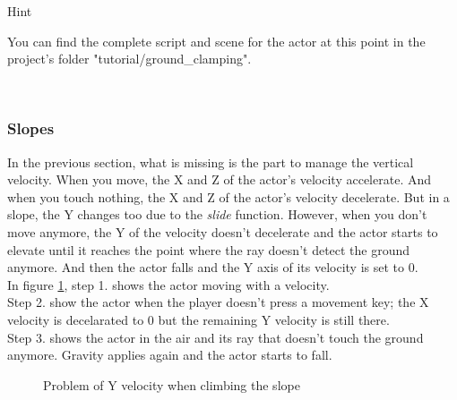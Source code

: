 \documentclass[10pt,a4paper]{article}
\newenvironment{hint}{%
\begin{bclogo}[logo=\bcinfo, couleurBarre=Green, noborder=true, 
               couleur=white]{Hint}
}{%
\end{bclogo}\hspace{1px}\\
}
\begin{document}
\begin{hint}
You can find the complete script and scene for the actor at this point in the project's folder "tutorial/ground\_clamping".
\end{hint}

\subsubsection{Slopes}
\label{subsec:slopes}
In the previous section, what is missing is the part to manage the vertical velocity. When you move, the X and Z of the actor's velocity accelerate. And when you touch nothing, the X and Z of the actor's velocity decelerate. But in a slope, the Y changes too due to the \textit{slide} function. However, when you don't move anymore, the Y of the velocity doesn't decelerate and the actor starts to elevate until it reaches the point where the ray doesn't detect the ground anymore. And then the actor falls and the Y axis of its velocity is set to 0.\\
In figure \ref{fig:problem_climb_slope}, step 1. shows the actor moving with a velocity. \\
Step 2. show the actor when the player doesn't press a movement key; the X velocity is decelarated to 0 but the remaining Y velocity is still there. \\
Step 3. shows the actor in the air and its ray that doesn't touch the ground anymore. Gravity applies again and the actor starts to fall.

\begin{figure}[H]
\centering
{}
\caption{Problem of Y velocity when climbing the slope}
\label{fig:problem_climb_slope}
\end{figure}
\end{document}
